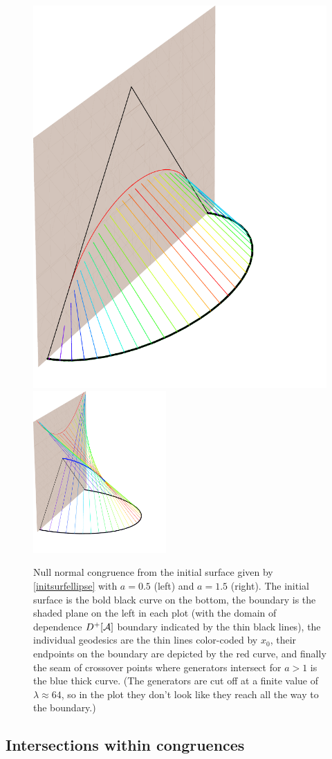 \documentclass[12pt]{article}
\def\regA{{\cal A}}
\begin{document}
\begin{figure}[ht!]
\begin{center}
\includegraphics[width=2.in]{congruencea0p5}
\hspace{2cm}
\includegraphics[width=2in]{congruencea1p5}
\caption{
Null normal congruence from the initial surface given by \eqref{initsurfellipse} with $a=0.5$ (left) and $a=1.5$ (right).  The initial surface is the bold black curve on the bottom, the boundary is the shaded plane on the left in each plot (with the domain of dependence $D^+[\regA]$ boundary indicated by the thin black lines), the individual geodesics are the thin lines color-coded by $x_0$, their endpoints on the boundary are depicted by the red curve, and finally the seam of crossover points where generators intersect for $a>1$ is the blue thick curve.  (The generators are cut off at a finite value of $\lambda \approx 64$, so in the plot they don't look like they reach all the way to the boundary.)
}
\label{f:congruence}
\end{center}
\end{figure}
% 

\subsection{Intersections within congruences}
\end{document}

